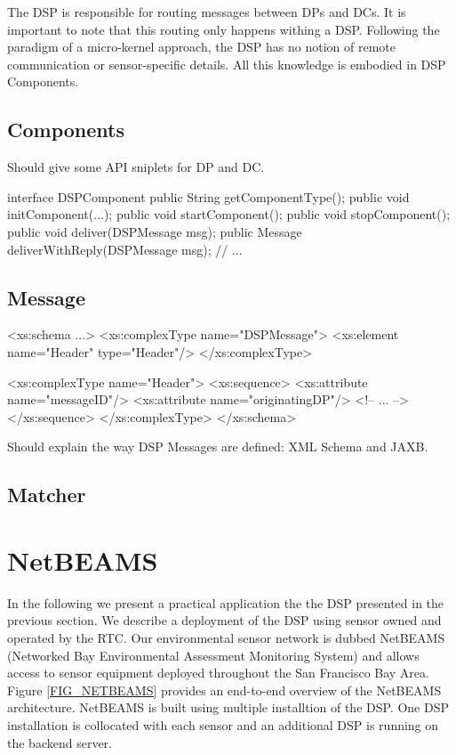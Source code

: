 \documentclass[conference]{IEEEtran}
\begin{document}
The DSP is responsible for routing messages between DPs and DCs. It is
important to note that this routing only happens withing a
DSP. Following the paradigm of a micro-kernel approach, the DSP has no
notion of remote communication or sensor-specific details. All this
knowledge is embodied in DSP Components.

\subsection{Components}

Should give some API sniplets for DP and DC.

\begin{code}
interface DSPComponent
{
   public String getComponentType();
   public void initComponent(...);
   public void startComponent();
   public void stopComponent();
   public void deliver(DSPMessage msg);
   public Message deliverWithReply(DSPMessage msg);
   // ...
}
\end{code}


\subsection{Message}

\begin{code}
<xs:schema ...>
  <xs:complexType name="DSPMessage">
    <xs:element name="Header" type="Header"/>
  </xs:complexType>

  <xs:complexType name="Header">
    <xs:sequence>
      <xs:attribute name="messageID"/>
      <xs:attribute name="originatingDP"/>
      <!-- ... -->
    </xs:sequence>
  </xs:complexType>
</xs:schema>
\end{code}

Should explain the way DSP Messages are defined: XML Schema and JAXB.

\subsection{Matcher}


\section{NetBEAMS}

In the following we present a practical application the the DSP
presented in the previous section. We describe a deployment of the DSP
using sensor owned and operated by the RTC. Our environmental sensor
network is dubbed NetBEAMS (Networked Bay Environmental Assessment
Monitoring System) and allows access to sensor equipment deployed
throughout the San Francisco Bay Area. Figure \ref{FIG_NETBEAMS}
provides an end-to-end overview of the NetBEAMS architecture. NetBEAMS
is built using multiple installtion of the DSP. One DSP installation
is collocated with each sensor and an additional DSP is running on the
backend server.
\end{document}
